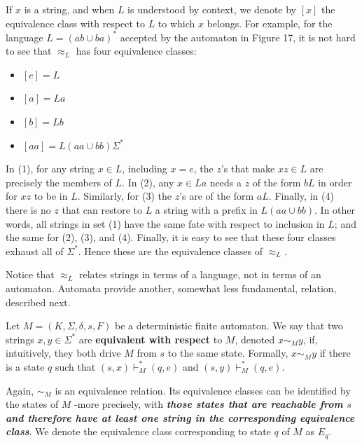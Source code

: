 \begin{example}{}
  If $x$ is a string, and when $L$ is understood by context, we denote by $\left[ x \right]$ the equivalence class with respect to $L$ to which $x$ belongs. For example, for the language $L = (ab \cup ba)^*$ accepted by the automaton in Figure 17, it is not hard to see that $\approx_L$ has four equivalence classes:
  \begin{itemize}
    \item $\left[ e \right] = L$
    \item $\left[ a \right] = La$
    \item $\left[ b \right] = Lb$
    \item $\left[ aa \right] = L(aa \cup bb) \Sigma^*$
  \end{itemize}
  In (1), for any string $x \in L$, including $x = e$, the $z$'s that make $xz \in L$ are precisely the members of $L$. In (2), any $x \in La$ needs a $z$ of the form $bL$ in order for $xz$ to be in $L$. Similarly, for (3) the $z$'s are of the form $aL$. Finally, in (4) there is no $z$ that can restore to $L$ a string with a prefix in $L(aa \cup bb)$. In other words, all strings in set (1) have the same fate with respect to inclusion in $L$; and the same for (2), (3), and (4). Finally, it is easy to see that these four classes exhaust all of $\Sigma^*$. Hence these are the equivalence classes of $\approx_L$.
\end{example}

Notice that $\approx_L$ relates strings in terms of a language, not in terms of an automaton. Automata provide another, somewhat less fundamental, relation, described next.

\begin{definition}{}
  Let $M = (K, \Sigma, \delta, s, F)$ be a deterministic finite automaton. We say that two strings $x, y \in \Sigma^*$ are \textbf{equivalent with respect} to $M$, denoted $x \sim_M y$, if, intuitively, they both drive $M$ from $s$ to the same state. Formally, $x \sim_M y$ if there is a state $q$ such that $(s, x) \vdash_M^* (q, e)$ and $(s, y) \vdash_M^* (q, e)$.

  \quad Again, $\sim_M$ is an equivalence relation. Its equivalence classes can be identified by the states of $M$ -more precisely, with \textbf{\textit{those states that are reachable from $s$ and therefore have at least one string in the corresponding equivalence class}}. We denote the equivalence class corresponding to state $q$ of $M$ as $E_q$.
\end{definition}

